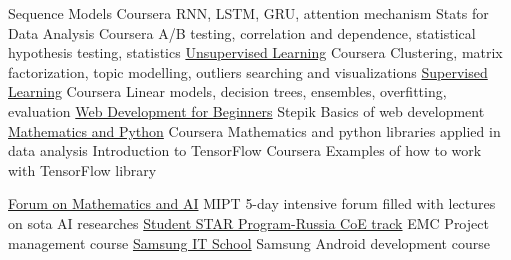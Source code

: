 \documentclass[
	a4paper,
]{fortysecondscv}
\begin{document}
\newpage
\makebacksidebar


\begin{cvtable}[1.5]
        {Sequence Models}
        {Coursera}
        {RNN, LSTM, GRU, attention mechanism}
        {Stats for Data Analysis}
        {Coursera}
        {A/B testing, correlation and dependence, statistical hypothesis testing, statistics}
        {\href{https://www.coursera.org/account/accomplishments/certificate/BADWME4J7J8E}
        {Unsupervised Learning}}
        {Coursera}
        {Clustering, matrix factorization, topic modelling, outliers 
         searching and visualizations}
        {\href{https://coursera.org/share/f90c8676dcf8c9e33dfe0443387988ef}
        {Supervised Learning}}
        {Coursera}
        {Linear models, decision trees, ensembles, overfitting, evaluation}
        {\href{https://stepik.org/cert/321173}
        {Web Development for Beginners}}
        {Stepik}
        {Basics of web development}
        {\href{https://coursera.org/share/faf5859452fbdda8a36084effc34793a}
        {Mathematics and Python}}
        {Coursera}
        {Mathematics and python libraries applied in data analysis}
        {Introduction to TensorFlow}
        {Coursera}
        {Examples of how to work with TensorFlow library}
\end{cvtable}

\begin{cvtable}[1.5]
        {\href{https://vk.com/math_ai}
        {Forum on Mathematics and AI}}
        {MIPT}
        {5-day intensive forum filled with lectures on sota AI researches}
        {\href{https://education.dellemc.com/content/emc/en-us/student-star.html}
        {Student STAR Program-Russia CoE track}}
        {EMC}
        {Project management course}
        {\href{https://myitschool.ru/}
        {Samsung IT School}}
        {Samsung}
        {Android development course}
\end{cvtable}
\end{document}

